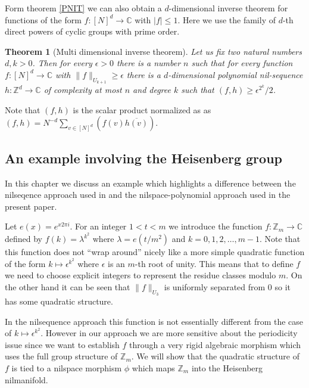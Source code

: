 \documentclass [11pt] {article}
\newtheorem{theorem}{Theorem}
\begin{document}
Form theorem \ref{PNIT} we can also obtain a $d$-dimensional inverse theorem for functions of the form $f:[N]^d\rightarrow\mathbb{C}$ with $|f|\leq 1$. Here we use the family of $d$-th direct powers of cyclic groups with prime order. 

\begin{theorem}[Multi dimensional inverse theorem] Let us fix two natural numbers $d,k>0$. Then for every $\epsilon>0$ there is a number $n$ such that for every function $f:[N]^d\rightarrow\mathbb{C}$ with $\|f\|_{U_{k+1}}\geq\epsilon$ there is a $d$-dimensional polynomial nil-sequence $h:\mathbb{Z}^d\rightarrow\mathbb{C}$ of complexity at most $n$ and degree $k$ such that $(f,h)\geq \epsilon^{2^k}/2$. 
\end{theorem}

Note that $(f,h)$ is the scalar product normalized as as $(f,h)=N^{-d}\sum_{v\in [N]^d}(f(v)\overline{h(v)})$.


\subsection{An example involving the Heisenberg group}\label{heis}

In this chapter we discuss an example which highlights a difference between the nilseqence approach used in \cite{GTZ} and the nilspace-polynomial approach used in the present paper. 

Let $e(x)=e^{x2\pi i}$. For an integer $1<t<m$ we introduce the function $f:\mathbb{Z}_m\rightarrow\mathbb{C}$ defined by $f(k)=\lambda^{k^2}$ where $\lambda=e(t/m^2)$ and $k=0,1,2,\dots,m-1$. Note that this function does not ``wrap around'' nicely like a more simple quadratic function of the form $k\mapsto\epsilon^{k^2}$ where $\epsilon$ is an $m$-th root of unity. This means that to define $f$ we need to choose explicit integers to represent the residue classes modulo $m$.
On the other hand it can be seen that $\|f\|_{U_3}$ is uniformly separated from $0$ so it has some quadratic structure.

In the nilsequence approach this function is not essentially different from the case of $k\mapsto\epsilon^{k^2}$.
However in our approach we are more sensitive about the periodicity issue since we want to establish $f$ through a very rigid algebraic morphism which uses the full group structure of $\mathbb{Z}_m$.
We will show that the quadratic structure of $f$ is tied to a nilspace morphism $\phi$ which maps $\mathbb{Z}_m$ into the Heisenberg nilmanifold.
\end{document}
